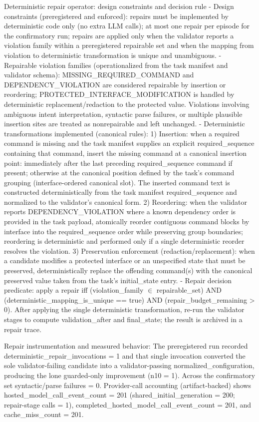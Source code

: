 \documentclass[conference]{IEEEtran}
\begin{document}
Deterministic repair operator: design constraints and decision rule
- Design constraints (preregistered and enforced): repairs must be implemented by deterministic code only (no extra LLM calls); at most one repair per episode for the confirmatory run; repairs are applied only when the validator reports a violation family within a preregistered repairable set and when the mapping from violation to deterministic transformation is unique and unambiguous.
- Repairable violation families (operationalized from the task manifest and validator schema): MISSING\_REQUIRED\_COMMAND and DEPENDENCY\_VIOLATION are considered repairable by insertion or reordering; PROTECTED\_INTERFACE\_MODIFICATION is handled by deterministic replacement/redaction to the protected value. Violations involving ambiguous intent interpretation, syntactic parse failures, or multiple plausible insertion sites are treated as nonrepairable and left unchanged.
- Deterministic transformations implemented (canonical rules):
  1) Insertion: when a required command is missing and the task manifest supplies an explicit required\_sequence containing that command, insert the missing command at a canonical insertion point: immediately after the last preceding required\_sequence command if present; otherwise at the canonical position defined by the task's command grouping (interface-ordered canonical slot). The inserted command text is constructed deterministically from the task manifest required\_sequence and normalized to the validator's canonical form.
  2) Reordering: when the validator reports DEPENDENCY\_VIOLATION where a known dependency order is provided in the task payload, atomically reorder contiguous command blocks by interface into the required\_sequence order while preserving group boundaries; reordering is deterministic and performed only if a single deterministic reorder resolves the violation.
  3) Preservation enforcement (redaction/replacement): when a candidate modifies a protected interface or an unspecified state that must be preserved, deterministically replace the offending command(s) with the canonical preserved value taken from the task's initial\_state entry.
- Repair decision predicate: apply a repair iff (violation\_family \ensuremath{\in} repairable\_set) AND (deterministic\_mapping\_is\_unique == true) AND (repair\_budget\_remaining > 0). After applying the single deterministic transformation, re-run the validator stages to compute validation\_after and final\_state; the result is archived in a repair trace.

Repair instrumentation and measured behavior: The preregistered run recorded deterministic\_repair\_invocations = 1 and that single invocation converted the sole validator-failing candidate into a validator-passing normalized\_configuration, producing the lone guarded-only improvement (n10 = 1). Across the confirmatory set syntactic/parse failures = 0. Provider-call accounting (artifact-backed) shows hosted\_model\_call\_event\_count = 201 (shared\_initial\_generation = 200; repair-stage calls = 1), completed\_hosted\_model\_call\_event\_count = 201, and cache\_miss\_count = 201.
\end{document}
